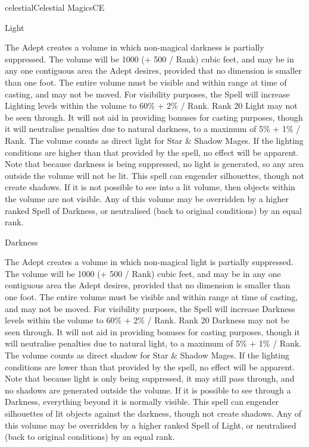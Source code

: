 \begin{college}[1.3]{celestial}{Celestial Magics}{CE}
\begin{spell}[G-2]{Light}
\begin{effects}
The Adept creates a volume in which non-magical darkness is partially
suppressed. The volume will be 1000 (+ 500 / Rank) cubic feet, and may
be in any one contiguous area the Adept desires, provided that no
dimension is smaller than one foot. The entire volume must be visible
and within range at time of casting, and may not be moved. For
visibility purposes, the Spell will increase Lighting levels within
the volume to 60\% + 2\% / Rank. Rank 20 Light may not be seen
through. It will not aid in providing bonuses for casting purposes,
though it will neutralise penalties due to natural darkness, to a
maximum of 5\% + 1\% / Rank.  The volume counts as direct light for
Star \& Shadow Mages.  If the lighting conditions are higher than that
provided by the spell, no effect will be apparent. Note that because
darkness is being suppressed, no light is generated, so any area
outside the volume will not be lit. This spell can engender
silhouettes, though not create shadows. If it is not possible to see
into a lit volume, then objects within the volume are not visible. Any
of this volume may be overridden by a higher ranked Spell of Darkness,
or neutralised (back to original conditions) by an equal rank.
\end{effects}
\end{spell}

\begin{spell}[G-3]{Darkness}

\begin{effects}
The Adept creates a volume in which non-magical light is partially
suppressed. The volume will be 1000 (+ 500 / Rank) cubic feet, and may
be in any one contiguous area the Adept desires, provided that no
dimension is smaller than one foot. The entire volume must be visible
and within range at time of casting, and may not be moved. For
visibility purposes, the Spell will increase Darkness levels within
the volume to 60\% + 2\% / Rank. Rank 20 Darkness may not be seen
through. It will not aid in providing bonuses for casting purposes,
though it will neutralise penalties due to natural light, to a maximum
of 5\% + 1\% / Rank. The volume counts as direct shadow for Star \&
Shadow Mages. If the lighting conditions are lower than that provided
by the spell, no effect will be apparent. Note that because light is
only being suppressed, it may still pass through, and no shadows are
generated outside the volume. If it is possible to see through a
Darkness, everything beyond it is normally visible.  This spell can
engender silhouettes of lit objects against the darkness, though not
create shadows. Any of this volume may be overridden by a higher
ranked Spell of Light, or neutralised (back to original conditions) by
an equal rank.
\end{effects}
\end{spell}


\end{college}
